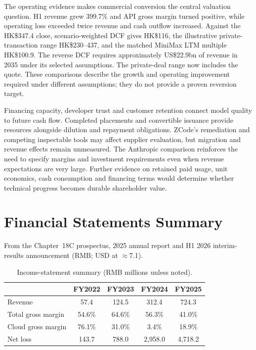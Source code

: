 \documentclass[11pt]{article}
\begin{document}
The operating evidence makes commercial conversion the central valuation question. H1 revenue grew 399.7\% and API gross margin turned positive, while operating loss exceeded twice revenue and cash outflow increased. Against the HK\$347.4 close, scenario-weighted DCF gives HK\$116, the illustrative private-transaction range HK\$230--437, and the matched MiniMax LTM multiple HK\$100.9. The reverse DCF requires approximately US\$22.9bn of revenue in 2035 under its selected assumptions. The private-deal range now includes the quote. These comparisons describe the growth and operating improvement required under different assumptions; they do not provide a proven reversion target.

Financing capacity, developer trust and customer retention connect model quality to future cash flow. Completed placements and convertible issuance provide resources alongside dilution and repayment obligations. ZCode's remediation and competing inspectable tools may affect supplier evaluation, but migration and revenue effects remain unmeasured. The Anthropic comparison reinforces the need to specify margins and investment requirements even when revenue expectations are very large. Further evidence on retained paid usage, unit economics, cash consumption and financing terms would determine whether technical progress becomes durable shareholder value.

\appendix
\clearpage
\section{Financial Statements Summary}
\label{sec:statements}
From the Chapter~18C prospectus, 2025 annual report and H1 2026 interim-results announcement (RMB; USD at
$\approx$7.1).

\begin{table}[H]
\centering
\caption{Income-statement summary (RMB millions unless noted).}
\begin{tabular}{lcccc}
\toprule
 & FY2022 & FY2023 & FY2024 & FY2025 \\
\midrule
Revenue & 57.4 & 124.5 & 312.4 & 724.3 \\
Total gross margin & 54.6\% & 64.6\% & 56.3\% & 41.0\% \\
Cloud gross margin & 76.1\% & 31.0\% & 3.4\% & 18.9\% \\
Net loss & 143.7 & 788.0 & 2{,}958.0 & 4{,}718.2 \\
\bottomrule
\end{tabular}
\end{table}
\end{document}
